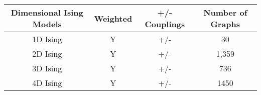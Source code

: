 \documentclass{standalone}
\begin{document}
\begin{tabular}{ |c|c|c|c| } 
    \hline
    Dimensional Ising Models & Weighted & +/- Couplings & Number of Graphs \\ 
    \hline
    1D Ising & Y & +/- & 30 \\ 
    2D Ising & Y & +/- & 1,359 \\ 
    3D Ising & Y & +/- & 736 \\ 
    4D Ising & Y & +/- & 1450 \\
    \hline
\end{tabular}
\end{document}
